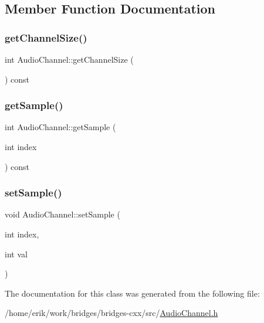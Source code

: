 \subsection{Member Function Documentation}
\mbox{\label{class_audio_channel_a6a8bcd65a43fe0697c3368559c5775ca}} 
\subsubsection{\texorpdfstring{get\+Channel\+Size()}{getChannelSize()}}
{\footnotesize\ttfamily int Audio\+Channel\+::get\+Channel\+Size (\begin{DoxyParamCaption}{ }\end{DoxyParamCaption}) const\hspace{0.3cm}{\ttfamily [inline]}}

\mbox{\label{class_audio_channel_a5030a4c2bcf41e1f13479de45bbf6d01}} 
\subsubsection{\texorpdfstring{get\+Sample()}{getSample()}}
{\footnotesize\ttfamily int Audio\+Channel\+::get\+Sample (\begin{DoxyParamCaption}\item[{int}]{index }\end{DoxyParamCaption}) const\hspace{0.3cm}{\ttfamily [inline]}}

\mbox{\label{class_audio_channel_a64bcb02bc7c731bc87d60c0ffabe7e99}} 
\subsubsection{\texorpdfstring{set\+Sample()}{setSample()}}
{\footnotesize\ttfamily void Audio\+Channel\+::set\+Sample (\begin{DoxyParamCaption}\item[{int}]{index,  }\item[{int}]{val }\end{DoxyParamCaption})\hspace{0.3cm}{\ttfamily [inline]}}



The documentation for this class was generated from the following file\+:\begin{DoxyCompactItemize}
\item 
/home/erik/work/bridges/bridges-\/cxx/src/\hyperlink{_audio_channel_8h}{Audio\+Channel.\+h}\end{DoxyCompactItemize}
